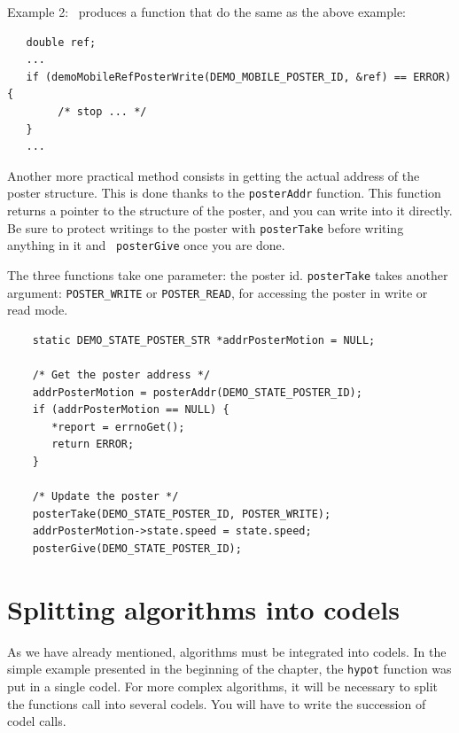 Example 2:  \GenoM\ produces a  function that  do the  same as  the above
example:

\begin{center}\begin{cartouche}\small\begin{verbatim}
   double ref;
   ...
   if (demoMobileRefPosterWrite(DEMO_MOBILE_POSTER_ID, &ref) == ERROR) {
        /* stop ... */
   }
   ...
\end{verbatim}\end{cartouche}\end{center}

\bigbreak

Another more practical  method consists in getting  the actual address of
the poster   structure.   This is done thanks    to the  {\tt posterAddr}
function. This function returns a pointer to the structure of the poster,
and you can  write into it directly. Be  sure to protect writings to  the
poster with {\tt posterTake} before    writing anything in it and    {\tt
posterGive} once you are done.

The three functions take one  parameter: the poster id. {\tt posterTake}
takes another  argument:  {\tt POSTER\_WRITE} or  {\tt POSTER\_READ}, for
accessing the poster in write or read mode.

\begin{center}\begin{cartouche}\small\begin{verbatim}
    static DEMO_STATE_POSTER_STR *addrPosterMotion = NULL;

    /* Get the poster address */
    addrPosterMotion = posterAddr(DEMO_STATE_POSTER_ID);
    if (addrPosterMotion == NULL) {
       *report = errnoGet();
       return ERROR;
    }

    /* Update the poster */
    posterTake(DEMO_STATE_POSTER_ID, POSTER_WRITE);
    addrPosterMotion->state.speed = state.speed;
    posterGive(DEMO_STATE_POSTER_ID);
\end{verbatim}\end{cartouche}\end{center}


\section{Splitting algorithms into codels}
\label{sec|codels|split}

As   we have   already  mentioned,  algorithms   must  be integrated into
codels. In the simple example presented  in the beginning of the chapter,
the  {\tt hypot} function  was put in a   single codel.  For more complex
algorithms, it will be necessary to split the functions call into several
codels. You will have to write the succession of codel calls.

